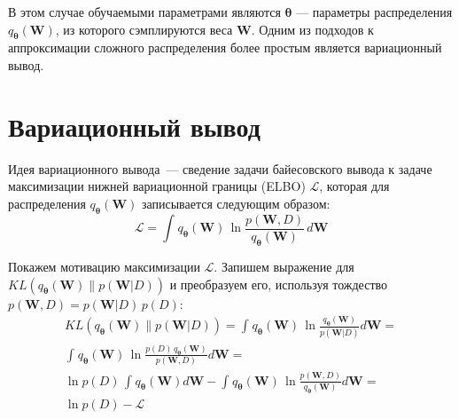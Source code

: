 \documentclass{article}
\numberwithin{equation}{section}
\begin{document}
    В этом случае обучаемыми параметрами являются $\pmb{\theta}$
    --- параметры распределения $q_{\pmb{\theta}}(\pmb{W})$,
    из которого сэмплируются веса $\pmb{W}$.
    Одним из подходов к аппроксимации сложного распределения более простым является вариационный вывод.

    \section{Вариационный вывод}

    Идея вариационного вывода~--- сведение задачи байесовского вывода
    к задаче максимизации нижней вариационной границы (ELBO) $\mathcal{L}$,
    которая для распределения $q_{\pmb{\theta}}(\pmb{W})$
    записывается следующим образом:
    \begin{equation}
        \mathcal{L}
        =
            \int_{}{
                q_{\pmb{\theta}}(\pmb{W})
                \,
                \ln{
                    \frac
                        {p(\pmb{W}, D)}
                        {q_{\pmb{\theta}}(\pmb{W})}
                }
                \,
                d\pmb{W}
            }
    \end{equation}

    Покажем мотивацию максимизации $\mathcal{L}$.
    Запишем выражение для
    $
    KL(
        q_{\pmb{\theta}}(\pmb{W})
        \parallel
        p(\pmb{W}| D)
    )
    $
    и преобразуем его, используя тождество $p(\pmb{W}, D) = p(\pmb{W}| D) \, p(D)$:
    \begin{equation}
    \begin{split}
        KL(
            q_{\pmb{\theta}}(\pmb{W})
            \parallel
            p(\pmb{W}| D)
        )
        =
            \int_{}{
                q_{\pmb{\theta}}(\pmb{W})
                \,
                \ln{
                    \frac
                        {
                            q_{\pmb{\theta}}(\pmb{W})
                        }
                        {p(\pmb{W} | D)}
                }
                d\pmb{W}
            }
        = \\
            \int_{}{
                q_{\pmb{\theta}}(\pmb{W})
                \,
                \ln{
                    \frac
                        {
                            p(D)
                            \,
                            q_{\pmb{\theta}}(\pmb{W})
                        }
                        {p(\pmb{W}, D)}
                }
                d\pmb{W}
            }
        = \\
            \ln{p(D)}
            \,
            \int_{}{
                q_{\pmb{\theta}}(\pmb{W}) d\pmb{W}
            }
            -
            \int_{}{
                q_{\pmb{\theta}}(\pmb{W})
                \,
                \ln{
                    \frac
                        {p(\pmb{W}, D)}
                        {q_{\pmb{\theta}}(\pmb{W})}
                }
                d\pmb{W}
            }
        = \\
            \ln{p(D)} - \mathcal{L}
    \end{split}
    \end{equation}
\end{document}
